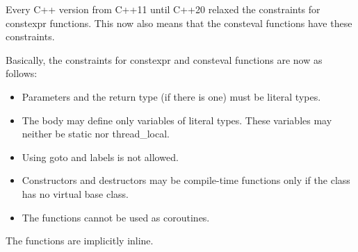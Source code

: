 Every C++ version from C++11 until C++20 relaxed the constraints for constexpr functions. This now also means that the consteval functions have these constraints.

Basically, the constraints for constexpr and consteval functions are now as follows:

\begin{itemize}
\item 
Parameters and the return type (if there is one) must be literal types.

\item
The body may define only variables of literal types. These variables may neither be static nor thread\_local.

\item
Using goto and labels is not allowed.

\item
Constructors and destructors may be compile-time functions only if the class has no virtual base class.

\item
The functions cannot be used as coroutines.
\end{itemize}

The functions are implicitly inline.